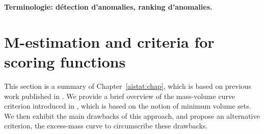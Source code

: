 \begin{remarque}{\bf Terminologie: détection d'anomalies, ranking d'anomalies.\\}



\end{remarque}


\section{M-estimation and criteria for scoring functions}
\label{resume_fr:scoring}

This section is a summary of Chapter~\ref{aistat:chap}, which is based on previous work published in \cite{AISTAT15}. We provide a brief overview of the mass-volume curve criterion introduced in \cite{CLEM13}, which is based on the notion of minimum volume sets. We then exhibit the main drawbacks of this approach, and propose an alternative criterion, the excess-mass curve to circumscribe these drawbacks. 

